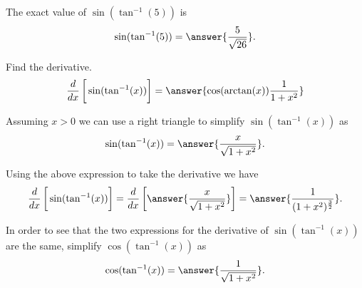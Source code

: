 \documentclass{ximera}
\author{Nela Lakos \and Kyle Parsons}
\begin{document}
\begin{exercise}

The exact value of $\sin(\tan^{-1}(5))$ is
\[
\sin(\tan^{-1}(5)) = \answer{\frac{5}{\sqrt{26}}}.
\]

Find the derivative.
\[
\frac{d}{dx}\left[\vphantom{\frac{d}{dx}}\sin(\tan^{-1}(x))\right] = \answer{\cos(\arctan(x))\frac{1}{1+x^2}}
\]

Assuming $x>0$ we can use a right triangle to simplify $\sin(\tan^{-1}(x))$ as
\[
\sin(\tan^{-1}(x)) = \answer{\frac{x}{\sqrt{1+x^2}}}.
\]

Using the above expression to take the derivative we have
\[
\frac{d}{dx}\left[\vphantom{\frac{d}{dx}}\sin(\tan^{-1}(x))\right] = \frac{d}{dx}\left[\vphantom{\frac{d}{dx}}\answer{\frac{x}{\sqrt{1+x^2}}}\right] = \answer{\frac{1}{(1+x^2)^{\frac{3}{2}}}}.
\]

In order to see that the two expressions for the derivative of $\sin(\tan^{-1}(x))$ are the same, simplify $\cos(\tan^{-1}(x))$ as
\[
\cos(\tan^{-1}(x)) = \answer{\frac{1}{\sqrt{1+x^2}}}.
\]

\end{exercise}
\end{document}
